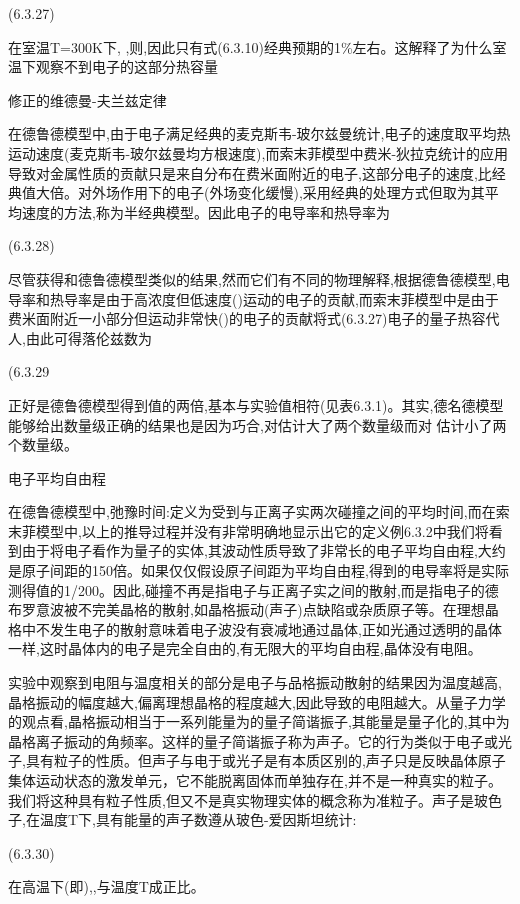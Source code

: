  	(6.3.27)

在室温T=300K下, ,则,因此只有式(6.3.10)经典预期的1\%左右。这解释了为什么室温下观察不到电子的这部分热容量

修正的维德曼-夫兰兹定律

在德鲁德模型中,由于电子满足经典的麦克斯韦-玻尔兹曼统计,电子的速度取平均热运动速度(麦克斯韦-玻尔兹曼均方根速度),而索末菲模型中费米-狄拉克统计的应用导致对金属性质的贡献只是来自分布在费米面附近的电子,这部分电子的速度,比经典值大倍。对外场作用下的电子(外场变化缓慢),采用经典的处理方式但取为其平均速度的方法,称为半经典模型。因此电子的电导率和热导率为

 	(6.3.28)

尽管获得和德鲁德模型类似的结果,然而它们有不同的物理解释,根据德鲁德模型,电导率和热导率是由于高浓度但低速度()运动的电子的贡献,而索末菲模型中是由于费米面附近一小部分但运动非常快()的电子的贡献将式(6.3.27)电子的量子热容代人,由此可得落伦兹数为

 	(6.3.29

正好是德鲁德模型得到值的两倍,基本与实验值相符(见表6.3.1)。其实,德名德模型能够给出数量级正确的结果也是因为巧合,对估计大了两个数量级而对 估计小了两个数量级。

电子平均自由程

在德鲁德模型中,弛豫时间:定义为受到与正离子实两次碰撞之间的平均时间,而在索末菲模型中,以上的推导过程并没有非常明确地显示出它的定义例6.3.2中我们将看到由于将电子看作为量子的实体,其波动性质导致了非常长的电子平均自由程,大约是原子间距的150倍。如果仅仅假设原子间距为平均自由程,得到的电导率将是实际测得值的1/200。因此,碰撞不再是指电子与正离子实之间的散射,而是指电子的德布罗意波被不完美晶格的散射,如晶格振动(声子)点缺陷或杂质原子等。在理想晶格中不发生电子的散射意味着电子波没有衰减地通过晶体,正如光通过透明的晶体一样,这时晶体内的电子是完全自由的,有无限大的平均自由程,晶体没有电阻。

实验中观察到电阻与温度相关的部分是电子与品格振动散射的结果因为温度越高,晶格振动的幅度越大,偏离理想晶格的程度越大,因此导致的电阻越大。从量子力学的观点看,晶格振动相当于一系列能量为的量子简谐振子,其能量是量子化的,其中为晶格离子振动的角频率。这样的量子简谐振子称为声子。它的行为类似于电子或光子,具有粒子的性质。但声子与电于或光子是有本质区别的,声子只是反映晶体原子集体运动状态的激发单元，它不能脱离固体而单独存在,并不是一种真实的粒子。我们将这种具有粒子性质,但又不是真实物理实体的概念称为准粒子。声子是玻色子,在温度T下,具有能量的声子数遵从玻色-爱因斯坦统计:

 	(6.3.30)

在高温下(即),,与温度T成正比。

